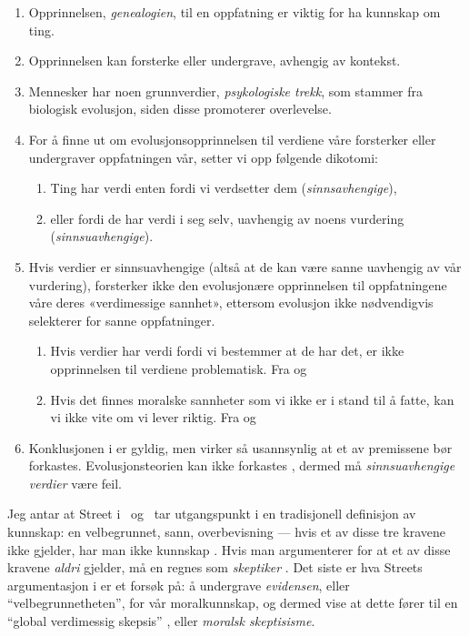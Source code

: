 \documentclass[a4paper,norsk]{article}
\begin{document}
\begin{enumerate}
\def\labelenumi{\itshape\oldstylenums{\arabic{enumi}.}}
\def\labelenumii{\itshape\alph{enumii}.}
\item\label{1}
  Opprinnelsen, \emph{genealogien}, til en oppfatning er viktig for ha kunnskap
  om ting.
\item\label{2}
  Opprinnelsen kan forsterke eller undergrave, avhengig av kontekst.
\item\label{3}
  Mennesker har noen grunnverdier, \emph{psykologiske trekk}, som
  stammer fra biologisk evolusjon, siden disse promoterer overlevelse.
\item\label{4}
  For å finne ut om evolusjonsopprinnelsen til verdiene våre forsterker
  eller undergraver oppfatningen vår, setter vi opp følgende dikotomi:

  \begin{enumerate}
  \item\label{4a}
    Ting har verdi enten fordi vi verdsetter dem
    (\emph{sinnsavhengige}),
  \item\label{4b}
    eller fordi de har verdi i seg selv, uavhengig av noens vurdering
    (\emph{sinnsuavhengige}).
  \end{enumerate}
\item\label{5}
  Hvis verdier er sinnsuavhengige (altså at de kan være sanne uavhengig av vår
  vurdering), forsterker ikke den evolusjonære opprinnelsen til oppfatningene
  våre deres «verdimessige sannhet», ettersom evolusjon ikke nødvendigvis
  selekterer for sanne oppfatninger.

  \begin{enumerate} \item\label{5a} Hvis verdier har verdi fordi vi bestemmer
    at de har det, er ikke opprinnelsen til verdiene problematisk. Fra
     og  \item\label{5b} Hvis det finnes moralske
    sannheter som vi ikke er i stand til å fatte, kan vi ikke vite om vi lever
riktig. Fra  og  \end{enumerate} \item\label{6}
Konklusjonen i  er gyldig, men virker så usannsynlig at et av
premissene bør forkastes. Evolusjonsteorien  kan ikke forkastes
\autocite[jf.][]{dawkins}, dermed må \emph{sinnsuavhengige verdier}
 være feil.  \end{enumerate}

Jeg antar at Street i ~og ~tar utgangspunkt i en
tradisjonell definisjon av kunnskap: en velbegrunnet, sann, overbevisning ---
hvis et av disse tre kravene ikke gjelder, har man ikke kunnskap
\autocite[87]{wikforss}. Hvis man argumenterer for at et av disse kravene
\emph{aldri} gjelder, må en regnes som \emph{skeptiker}
\autocite[90]{wikforss}. Det siste er hva Streets argumentasjon i
 er et forsøk på: å undergrave \emph{evidensen}, eller
\enquote{velbegrunnetheten}, for vår moralkunnskap, og dermed vise at dette
fører til en \enquote{global verdimessig skepsis} \autocite[451]{street}, eller
\emph{moralsk skeptisisme}.
\end{document}
